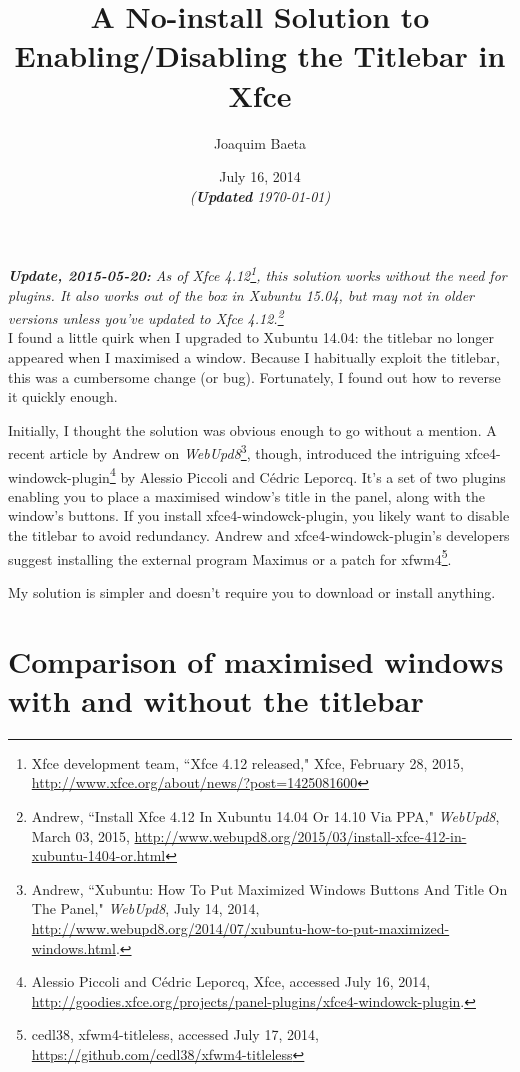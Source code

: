 \documentclass[12pt, a4paper]{article}
\title{\textbf{A No-install Solution to Enabling/Disabling the Titlebar in Xfce}}
\author{Joaquim Baeta}
\date{July 16, 2014\\ \normalsize \emph{(\textbf{Updated} \today)}}
\begin{document}
\maketitle

\noindent \emph{\textbf{Update, 2015-05-20:} As of Xfce 4.12\footnote{Xfce development team, ``Xfce 4.12 released," Xfce, February 28, 2015, \url{http://www.xfce.org/about/news/?post=1425081600}}, this solution works without the need for plugins. It also works out of the box in Xubuntu 15.04, but may not in older versions unless you've updated to Xfce 4.12.\footnote{Andrew, ``Install Xfce 4.12 In Xubuntu 14.04 Or 14.10 Via PPA," \emph{WebUpd8}, March 03, 2015, \url{http://www.webupd8.org/2015/03/install-xfce-412-in-xubuntu-1404-or.html}}}\\

\noindent I found a little quirk when I upgraded to Xubuntu 14.04: the titlebar no longer appeared when I maximised a window. Because I habitually exploit the titlebar, this was a cumbersome change (or bug). Fortunately, I found out how to reverse it quickly enough.

Initially, I thought the solution was obvious enough to go without a mention. A recent article by Andrew on \emph{WebUpd8}\footnote{Andrew, ``Xubuntu: How To Put Maximized Windows Buttons And Title On The Panel," \emph{WebUpd8}, July 14, 2014,  \url{http://www.webupd8.org/2014/07/xubuntu-how-to-put-maximized-windows.html}.}, though, introduced the intriguing xfce4-windowck-plugin\footnote{Alessio Piccoli and Cédric Leporcq, Xfce, accessed July 16, 2014, \url{http://goodies.xfce.org/projects/panel-plugins/xfce4-windowck-plugin}.} by Alessio Piccoli and Cédric Leporcq. It's a set of two plugins enabling you to place a maximised window's title in the panel, along with the window's buttons. If you install xfce4-windowck-plugin, you likely want to disable the titlebar to avoid redundancy. Andrew and xfce4-windowck-plugin's developers suggest installing the external program Maximus or a patch for xfwm4\footnote{cedl38, xfwm4-titleless, accessed July 17, 2014, \url{https://github.com/cedl38/xfwm4-titleless}}.

My solution is simpler and doesn't require you to download or install anything.

\section*{Comparison of maximised windows with and without the titlebar}
\end{document}

